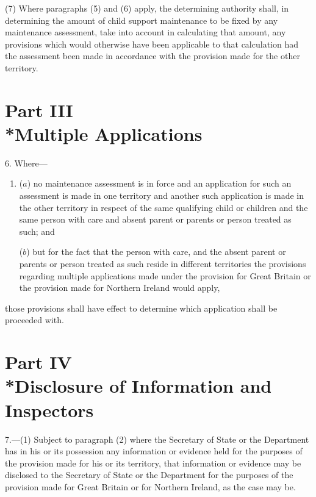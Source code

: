 \documentclass[12pt,a4paper]{article}
\begin{document}
(7) Where paragraphs (5) and (6) apply, the determining authority shall, in determining the amount of child support maintenance to be fixed by any maintenance assessment, take into account in calculating that amount, any provisions which would otherwise have been applicable to that calculation had the assessment been made in accordance with the provision made for the other territory.


\section[Part III --- Multiple Applications]{Part III\\*Multiple Applications}

\renewcommand\parthead{--- Schedule 1 Part III}

6.  Where—
\begin{enumerate}\item[]
($a$) no maintenance assessment is in force and an application for such an assessment is made in one territory and another such application is made in the other territory in respect of the same qualifying child or children and the same person with care and absent parent or parents or person treated as such; and

($b$) but for the fact that the person with care, and the absent parent or parents or person treated as such reside in different territories the provisions regarding multiple applications made under the provision for Great Britain or the provision made for Northern Ireland would apply,
\end{enumerate}
those provisions shall have effect to determine which application shall be proceeded with.

\section[Part IV --- Disclosure of Information and Inspectors]{Part IV\\*Disclosure of Information and Inspectors}

\renewcommand\parthead{--- Schedule 1 Part IV}

7.—(1) Subject to paragraph (2) where the Secretary of State
or the Department  %
has in his or its possession any information or evidence held for the purposes of the provision made for his or its territory, that information or evidence may be disclosed to the Secretary of State
or the Department  %
for the purposes of the provision made for Great Britain or for Northern Ireland, as the case may be.
\end{document}
